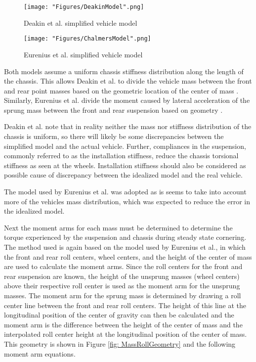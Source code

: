 \documentclass[a4paper]{article}
\numberwithin{equation}{section}
\begin{document}
\begin{figure}[h]
	\begin{minipage}{0.45\textwidth}
		\centering
		\texttt{[image: "Figures/DeakinModel".png]}
		\caption{Deakin et al. \cite{Deakin} simplified vehicle model}
		\label{fig: DeakinModel}
	\end{minipage}
	\hspace{0.1\textwidth}
	\begin{minipage}{0.45\textwidth}
		\texttt{[image: "Figures/ChalmersModel".png]}
		\caption{Eurenius et al. \cite{Chalmers} simplified vehicle model}
		\label{fig: ChalmersModel}
	\end{minipage}
\end{figure}

Both models assume a uniform chassis stiffness distribution along the length of the chassis. This allows Deakin et al. to divide the vehicle mass between the front and rear point masses based on the geometric location of the center of mass \cite{Deakin}. Similarly, Eurenius et al. divide the moment caused by lateral acceleration of the sprung mass between the front and rear suspension based on geometry \cite{Chalmers}.

Deakin et al. note that in reality neither the mass nor stiffness distribution of the chassis is uniform, so there will likely be some discrepancies between the simplified model and the actual vehicle. Further, compliances in the suspension, commonly referred to as the installation stiffness, reduce the chassis torsional stiffness as seen at the wheels. Installation stiffness should also be considered as possible cause of discrepancy between the idealized model and the real vehicle.

The model used by Eurenius et al. was adopted as is seems to take into account more of the vehicles mass distribution, which was expected to reduce the error in the idealized model.

Next the moment arms for each mass must be determined to determine the torque experienced by the suspension and chassis during steady state cornering. The method used is again based on the model used by Eurenius et al., in which the front and rear roll centers, wheel centers, and the height of the center of mass are used to calculate the moment arms. Since the roll centers for the front and rear suspension are known, the height of the unsprung masses (wheel centers) above their respective roll center is used as the moment arm for the unsprung masses. The moment arm for the sprung mass is determined by drawing a roll center line between the front and rear roll centers. The height of this line at the longitudinal position of the center of gravity can then be calculated and the moment arm is the difference between the height of the center of mass and the interpolated roll center height at the longitudinal position of the center of mass. This geometry is shown in Figure \ref{fig: MassRollGeometry} and the following moment arm equations.
\end{document}
